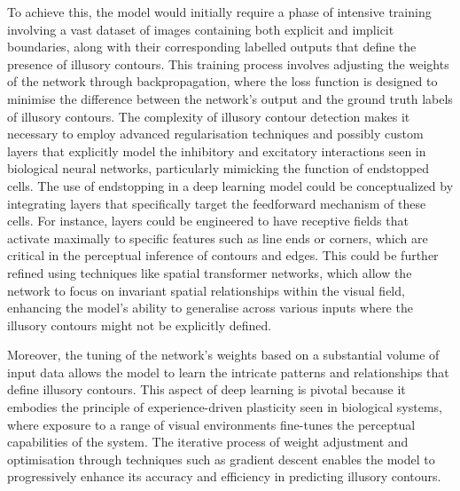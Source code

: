 \documentclass[12pt]{article}
\begin{document}
To achieve this, the model would initially require a phase of intensive training involving a vast dataset of images containing both explicit and implicit boundaries, along with their corresponding labelled outputs that define the presence of illusory contours. This training process involves adjusting the weights of the network through backpropagation, where the loss function is designed to minimise the difference between the network's output and the ground truth labels of illusory contours. The complexity of illusory contour detection makes it necessary to employ advanced regularisation techniques and possibly custom layers that explicitly model the inhibitory and excitatory interactions seen in biological neural networks, particularly mimicking the function of endstopped cells.
\bigbreak
The use of endstopping in a deep learning model could be conceptualized by integrating layers that specifically target the feedforward mechanism of these cells. For instance, layers could be engineered to have receptive fields that activate maximally to specific features such as line ends or corners, which are critical in the perceptual inference of contours and edges. This could be further refined using techniques like spatial transformer networks, which allow the network to focus on invariant spatial relationships within the visual field, enhancing the model's ability to generalise across various inputs where the illusory contours might not be explicitly defined.

Moreover, the tuning of the network's weights based on a substantial volume of input data allows the model to learn the intricate patterns and relationships that define illusory contours. This aspect of deep learning is pivotal because it embodies the principle of experience-driven plasticity seen in biological systems, where exposure to a range of visual environments fine-tunes the perceptual capabilities of the system. The iterative process of weight adjustment and optimisation through techniques such as gradient descent enables the model to progressively enhance its accuracy and efficiency in predicting illusory contours.
\end{document}
